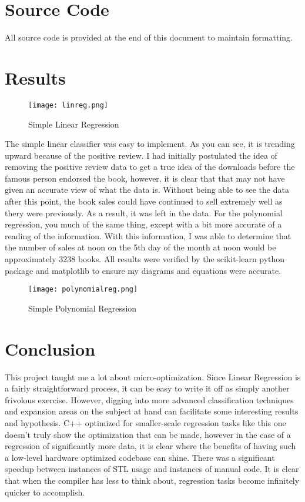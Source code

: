 \documentclass[11pt]{apa6}
\begin{document}
\section{Source Code}
All source code is provided at the end of this document to maintain formatting.

\section{Results}
\begin{figure}[!htb]
\texttt{[image: linreg.png]}
\caption{Simple Linear Regression}
\label{fig1}
\end{figure}
The simple linear classifier was easy to implement. As you can see, it is trending upward because of the positive review. I had initially postulated the idea of removing the positive review data to get a true idea of the downloads before the famous
person endorsed the book, however, it is clear that that may not have given an accurate view of what the data is. Without being able to see the data after this point, the book sales could have continued to sell extremely well as thery were previously.
As a result, it was left in the data. For the polynomial regression, you much of the same thing, except with a bit more accurate of a reading of the information. With this information, I was able to determine that the number of sales at noon on the 5th day of the month at noon would be approximately $3238$ books. All results were verified by the scikit-learn python package and matplotlib to ensure my diagrams and equations were accurate.
\begin{figure}[!htb]
\texttt{[image: polynomialreg.png]}
\caption{Simple Polynomial Regression}
\label{fig2}
\end{figure}

\section{Conclusion}
This project taught me a lot about micro-optimization. Since Linear Regression is a fairly straightforward process, it can be easy to write it off as simply another frivolous exercise. However, digging into more advanced classification techniques
and expansion areas on the subject at hand can facilitate some interesting results and hypothesis. C++ optimized for smaller-scale regression tasks like this one doesn't truly show the optimization that can be made, however in the case of a
regression of significantly more data, it is clear where the benefits of having such a low-level hardware optimized codebase can shine. There was a significant speedup between instances of STL usage and instances of manual code. It is clear that
when the compiler has less to think about, regression tasks become infinitely quicker to accomplish.
\end{document}
